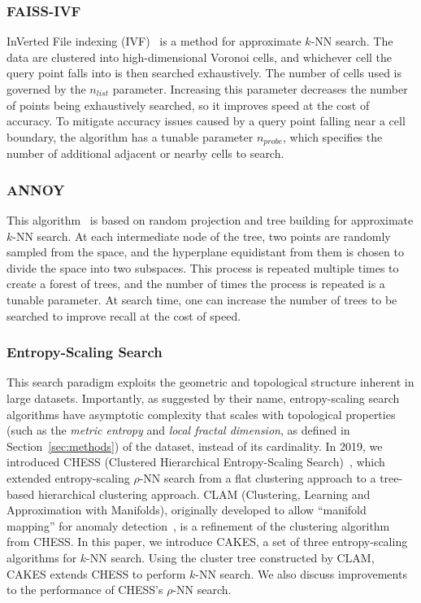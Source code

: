\subsubsection{FAISS-IVF}
\label{sec:introduction:related-works:faiss-ivf}

InVerted File indexing (IVF)~\cite{faissivf, sacks1987multikey, kent1990signature} is a method for approximate $k$-NN search. 
The data are clustered into high-dimensional Voronoi cells, and whichever cell the query point falls into is then searched exhaustively.
The number of cells used is governed by the $n_{list}$ parameter. 
Increasing this parameter decreases the number of points being exhaustively searched, so it improves speed at the cost of accuracy.
To mitigate accuracy issues caused by a query point falling near a cell boundary, the algorithm has a tunable parameter $n_{probe}$, which specifies the number of additional adjacent or nearby cells to search.


\subsubsection{ANNOY}
\label{sec:introduction:related-works:annoy}

This algorithm~\cite{annoy} is based on random projection and tree building for approximate $k$-NN search.
At each intermediate node of the tree, two points are randomly sampled from the space, and the hyperplane equidistant from them is chosen to divide the space into two subspaces.
This process is repeated multiple times to create a forest of trees, and the number of times the process is repeated is a tunable parameter.
At search time, one can increase the number of trees to be searched to improve recall at the cost of speed.

\subsubsection{Entropy-Scaling Search}
\label{sec:introduction:related-works:entropy-scaling-search}

This search paradigm exploits the geometric and topological structure inherent in large datasets.
Importantly, as suggested by their name, entropy-scaling search algorithms have asymptotic complexity that scales with topological properties (such as the \textit{metric entropy} and \textit{local fractal dimension}, as defined in Section~\ref{sec:methods}) of the dataset, instead of its cardinality.
In 2019, we introduced CHESS (Clustered Hierarchical Entropy-Scaling Search)~\cite{ishaq2019clustered}, which extended entropy-scaling $\rho$-NN search from a flat clustering approach to a tree-based hierarchical clustering approach.
CLAM (Clustering, Learning and Approximation with Manifolds), originally developed to allow ``manifold mapping'' for anomaly detection~\cite{ishaq2021clustered}, is a refinement of the clustering algorithm from CHESS.
In this paper, we introduce CAKES, a set of three entropy-scaling algorithms for $k$-NN search. 
Using the cluster tree constructed by CLAM, CAKES extends CHESS to perform $k$-NN search. We also discuss improvements to the performance of CHESS's $\rho$-NN search.
